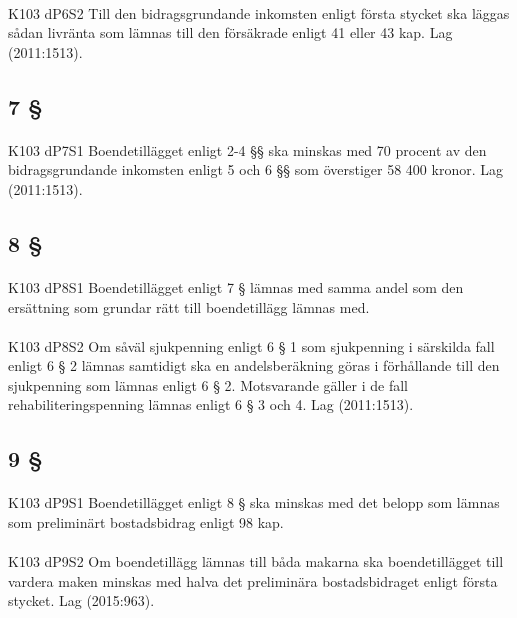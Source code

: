 \documentclass[a4paper,notitlepage,openany,10pt]{book}
\begin{document}
\paragraph*{}
{\tiny K103 dP6S2}
Till den bidragsgrundande inkomsten enligt första stycket ska läggas sådan livränta som lämnas till den försäkrade enligt 41 eller 43 kap.
Lag (2011:1513).
\subsection*{7 §}
\paragraph*{}
{\tiny K103 dP7S1}
Boendetillägget enligt 2-4 §§ ska minskas med 70 procent av den bidragsgrundande inkomsten enligt 5 och 6 §§ som överstiger 58 400 kronor.
Lag (2011:1513).
\subsection*{8 §}
\paragraph*{}
{\tiny K103 dP8S1}
Boendetillägget enligt 7 § lämnas med samma andel som den ersättning som grundar rätt till boendetillägg lämnas med.
\paragraph*{}
{\tiny K103 dP8S2}
Om såväl sjukpenning enligt 6 § 1 som sjukpenning i särskilda fall enligt 6 § 2 lämnas samtidigt ska en andelsberäkning göras i förhållande till den sjukpenning som lämnas enligt 6 § 2. Motsvarande gäller i de fall rehabiliteringspenning lämnas enligt 6 § 3 och 4.
Lag (2011:1513).
\subsection*{9 §}
\paragraph*{}
{\tiny K103 dP9S1}
Boendetillägget enligt 8 § ska minskas med det belopp som lämnas som preliminärt bostadsbidrag enligt 98 kap.
\paragraph*{}
{\tiny K103 dP9S2}
Om boendetillägg lämnas till båda makarna ska boendetillägget till vardera maken minskas med halva det preliminära bostadsbidraget enligt första stycket.
Lag (2015:963).
\end{document}
